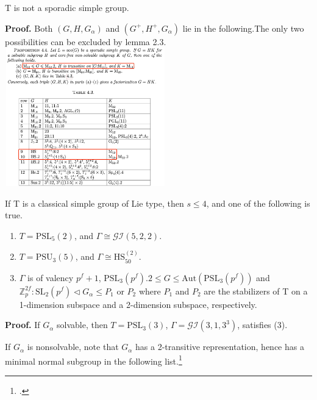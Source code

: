 \documentclass{beamer}
\def\SL{\mathrm{SL}}
\def\PSL{\mathrm{PSL}}
\def\PSU{\mathrm{PSU}}
\def\Aut{\mathrm{Aut}}
\def\HS{\mathrm{HS}}
\def\GI{\mathcal{GI}}
\begin{document}
\begin{frame}
\begin{lemma}[5.4]
T is not a sporadic simple group.
\end{lemma}
\textbf{Proof. }Both $(G,H,G_\alpha)$ and $(G^+,H^+,G_\alpha)$ lie in the following.The only two possibilities can be excluded by lemma 2.3.
\center \includegraphics[width=7cm,height=6cm]{sporadical.jpg}
\end{frame}

\begin{frame}
\begin{lemma}[5.5]
If T is a classical simple group of Lie type, then $s\leq 4$, and one of the following is true.
\begin{enumerate}
	\item $T=\PSL_5(2)$, and $\Gamma\cong\GI(5,2,2)$.
	\item $T=\PSU_3(5)$, and $\Gamma\cong\HS_{50}^{(2)}$.
	\item $\Gamma$ is of valency $p^f+1$, $\PSL_3(p^f).2\leq G\leq\Aut(\PSL_3(p^f))$ and $\mathbb{Z}_p^{2f}:\SL_2(p^f)\triangleleft G_\alpha\leq P_1$ or $P_2$ where $P_1$ and $P_2$ are the stabilizers of T on a 1-dimension subspace and a 2-dimension subspace, respectively.
\end{enumerate}
\end{lemma}
\textbf{Proof. }If $G_\alpha$ solvable, then $T=\PSL_3(3)$, $\Gamma=\GI(3,1,3^3)$, satisfies (3).

If $G_\alpha$ is nonsolvable, note that $G_\alpha$ has a 2-transitive representation, hence has a minimal normal subgroup in the following list.\footcite{Cameron1981}
\end{frame}
\end{document}
